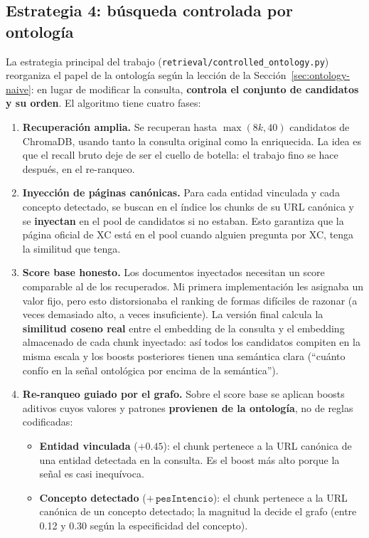 \documentclass[12pt, a4paper, twoside]{report}
\begin{document}
\subsection{Estrategia 4: b\'usqueda controlada por ontolog\'ia}
\label{sec:controlled}

La estrategia principal del trabajo (\texttt{retrieval/controlled\_ontology.py}) reorganiza el papel de la ontolog\'ia seg\'un la lecci\'on de la Secci\'on~\ref{sec:ontology-naive}: en lugar de modificar la consulta, \textbf{controla el conjunto de candidatos y su orden}. El algoritmo tiene cuatro fases:

\begin{enumerate}
  \item \textbf{Recuperaci\'on amplia.} Se recuperan hasta $\max(8k, 40)$ candidatos de ChromaDB, usando tanto la consulta original como la enriquecida. La idea es que el recall bruto deje de ser el cuello de botella: el trabajo fino se hace despu\'es, en el re-ranqueo.
  \item \textbf{Inyecci\'on de p\'aginas can\'onicas.} Para cada entidad vinculada y cada concepto detectado, se buscan en el \'indice los chunks de su URL can\'onica y se \textbf{inyectan} en el pool de candidatos si no estaban. Esto garantiza que la p\'agina oficial de XC est\'a en el pool cuando alguien pregunta por XC, tenga la similitud que tenga.
  \item \textbf{Score base honesto.} Los documentos inyectados necesitan un score comparable al de los recuperados. Mi primera implementaci\'on les asignaba un valor fijo, pero esto distorsionaba el ranking de formas dif\'iciles de razonar (a veces demasiado alto, a veces insuficiente). La versi\'on final calcula la \textbf{similitud coseno real} entre el embedding de la consulta y el embedding almacenado de cada chunk inyectado: as\'i todos los candidatos compiten en la misma escala y los boosts posteriores tienen una sem\'antica clara (``cu\'anto conf\'io en la se\~nal ontol\'ogica por encima de la sem\'antica'').
  \item \textbf{Re-ranqueo guiado por el grafo.} Sobre el score base se aplican boosts aditivos cuyos valores y patrones \textbf{provienen de la ontolog\'ia}, no de reglas codificadas:
  \begin{itemize}
    \item \textbf{Entidad vinculada} ($+0.45$): el chunk pertenece a la URL can\'onica de una entidad detectada en la consulta. Es el boost m\'as alto porque la se\~nal es casi inequ\'ivoca.
    \item \textbf{Concepto detectado} ($+\,\texttt{pesIntencio}$): el chunk pertenece a la URL can\'onica de un concepto detectado; la magnitud la decide el grafo (entre 0.12 y 0.30 seg\'un la especificidad del concepto).

\end{itemize}
\end{enumerate}
\end{document}
